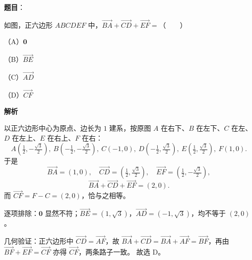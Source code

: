 \begin{answer}

\textbf{题目}：

如图，正六边形 $ABCDEF$ 中，$\overrightarrow{BA}+\overrightarrow{CD}+\overrightarrow{EF}=$\mbox{（　　）}

（A）$\mathbf 0$

（B）$\overrightarrow{BE}$

（C）$\overrightarrow{AD}$

（D）$\overrightarrow{CF}$
\nopagebreak[4]
\begin{center}\end{center}
\nopagebreak[4]
\textbf{解析}

以正六边形中心为原点、边长为 $1$ 建系，按原图 $A$ 在右下、$B$ 在左下、$C$ 在左、$D$ 在左上、$E$ 在右上、$F$ 在右：
\nopagebreak[4]
\[A\left(\tfrac12,-\tfrac{\sqrt3}{2}\right),\ B\left(-\tfrac12,-\tfrac{\sqrt3}{2}\right),\ C(-1,0),\ D\left(-\tfrac12,\tfrac{\sqrt3}{2}\right),\ E\left(\tfrac12,\tfrac{\sqrt3}{2}\right),\ F(1,0).\]
于是
\nopagebreak[4]
\[\overrightarrow{BA}=(1,0),\quad \overrightarrow{CD}=\left(\tfrac12,\tfrac{\sqrt3}{2}\right),\quad \overrightarrow{EF}=\left(\tfrac12,-\tfrac{\sqrt3}{2}\right),\]
\nopagebreak[4]
\[\overrightarrow{BA}+\overrightarrow{CD}+\overrightarrow{EF}=(2,0).\]
而 $\overrightarrow{CF}=F-C=(2,0)$，恰与之相等。

逐项排除：$\mathbf 0$ 显然不符；$\overrightarrow{BE}=\left(1,\sqrt3\right)$，$\overrightarrow{AD}=\left(-1,\sqrt3\right)$，均不等于 $(2,0)$。

几何验证：正六边形中 $\overrightarrow{CD}=\overrightarrow{AF}$，故 $\overrightarrow{BA}+\overrightarrow{CD}=\overrightarrow{BA}+\overrightarrow{AF}=\overrightarrow{BF}$，再由 $\overrightarrow{BF}+\overrightarrow{EF}=\overrightarrow{CF}$ 亦得 $\overrightarrow{CF}$，两条路子一致。
故选 D。


\end{answer}
